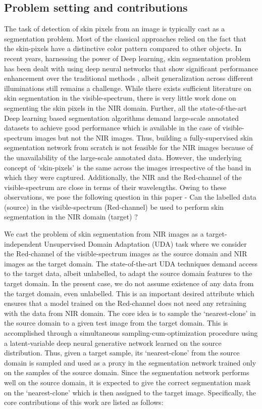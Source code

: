 \documentclass[runningheads]{llncs}
\begin{document}
\subsection{Problem setting and contributions}
The task of detection of skin pixels from an image is typically cast as a segmentation problem. Most of the classical approaches relied on the fact that the skin-pixels have a distinctive color pattern \cite{huynh2002skin,erdem2011combining} compared to other objects. In recent years, harnessing the power of Deep learning, skin segmentation problem has been dealt with using deep neural networks that show significant performance enhancement over the traditional methods \cite{long2015fully,ronneberger2015u,jones2002statistical}, albeit generalization across different illuminations still remains a challenge. 
While there exists sufficient literature on skin segmentation in the visible-spectrum, there is very little work done on segmenting the skin pixels in the NIR domain. Further, all the state-of-the-art Deep learning based segmentation algorithms demand large-scale annotated datasets to achieve good performance which is available in the case of visible-spectrum images but not the NIR images. Thus, building a fully-supervised skin segmentation network from scratch is not feasible for the NIR images because of the unavailability of the large-scale annotated data. However, the underlying concept of `skin-pixels' is the same across the images irrespective of the band in which they were captured. Additionally, the NIR and the Red-channel of the visible-spectrum are close in terms of their wavelengths.  Owing to these observations, we pose the following question in this paper - Can the labelled data (source) in the visible-spectrum (Red-channel) be used to perform skin segmentation in the NIR domain (target) \cite{pandey2020guided}? 
\par We cast the problem of skin segmentation from NIR images as a target-independent Unsupervised Domain Adaptation (UDA) task \cite{pandey2020target} where we consider the Red-channel of the visible-spectrum images as the source domain and NIR images as the target domain. The state-of-the-art UDA techniques demand access to the target data, albeit unlabelled, to adapt the source domain features to the target domain. In the present case, we do not assume existence of any data from the target domain, even unlabelled. This is an important desired attribute which ensures that a model trained on the Red-channel does not need any retraining with the data from NIR domain. The core idea is to sample the `nearest-clone' in the source domain to a given test image from the target domain. This is accomplished through a simultaneous sampling-cum-optimization procedure using a latent-variable deep neural generative network learned on the source distribution. Thus, given a target sample, its `nearest-clone' from the source domain is sampled and used as a proxy in the segmentation network trained only on the samples of the source domain. Since the segmentation network performs well on the source domain, it is expected to give the correct segmentation mask on the `nearest-clone' which is then assigned to the target image. Specifically, the core contributions of this work are listed as follows: 
\end{document}

